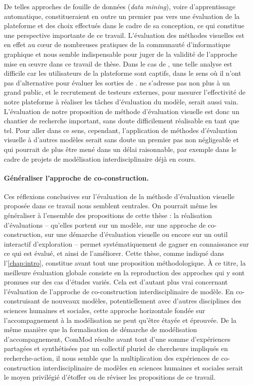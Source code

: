 De telles approches de \og fouille de données\fg{} (\textit{data mining}), voire d'apprentissage automatique, constitueraient en outre un premier pas vers une évaluation de la plateforme \simedb{} et des choix effectués dans le cadre de sa conception, ce qui constitue une perspective importante de ce travail. L'évaluation des méthodes visuelles est en effet au cœur de nombreuses pratiques de la communauté d'informatique graphique et nous semble indispensable pour juger de la validité de l'approche mise en œuvre dans ce travail de thèse. Dans le cas de \simedb{}, une telle analyse est difficile car les utilisateurs de la plateforme sont captifs, dans le sens où il n'ont pas d'alternative pour évaluer les sorties de \simfeodal{}. \simedb{} ne s'adresse pas non plus à un grand public, et le recrutement de \og testeurs\fg{} externes, pour mesurer l'effectivité de notre plateforme à réaliser les tâches d'évaluation du modèle, serait aussi vain. L'évaluation de notre proposition de méthode d'évaluation visuelle est donc un chantier de recherche important, sans doute difficilement réalisable en tant que tel. Pour aller dans ce sens, cependant, l'application de méthodes d'évaluation visuelle à d'autres modèles serait sans doute un premier pas non négligeable et qui pourrait de plus être mené dans un délai raisonnable, par exemple dans le cadre de projets de modélisation interdisciplinaire déjà en cours.

\paragraph{Généraliser l'approche de co-construction.}
Ces réflexions conclusives sur l'évaluation de la méthode d'évaluation visuelle proposée dans ce travail nous semblent centrales. On pourrait même les généraliser à l'ensemble des propositions de cette thèse : la réalisation d'évaluations -- qu'elles portent sur un modèle, sur une approche de co-construction, sur une démarche d'évaluation visuelle ou encore sur un outil interactif d'exploration -- permet systématiquement de gagner en connaissance sur ce qui est évalué, et ainsi de l'améliorer. Cette thèse, comme indiqué dans l'\cref{chap:intro}, constitue avant tout une proposition méthodologique. À ce titre, la meilleure évaluation globale consiste en la reproduction des approches qui y sont promues sur des cas d'études variés. Cela est d'autant plus vrai concernant l'évaluation de l'approche de co-construction interdisciplinaire de modèle. En co-construisant de nouveaux modèles, potentiellement avec d'autres disciplines des sciences humaines et sociales, cette approche horizontale fondée sur l'accompagnement à la modélisation ne peut qu'être étayée et éprouvée. De la même manière que la formalisation de démarche de modélisation d'accompagnement, ComMod \autocite{commod_modelisation_2005} résulte avant tout d'une somme d'expériences partagées et synthétisées par un collectif pluriel de chercheurs impliqués en recherche-action, il nous semble que la multiplication des expériences de co-construction interdisciplinaire de modèles en sciences humaines et sociales serait le moyen privilégié d'étoffer ou de réviser les propositions de ce travail.